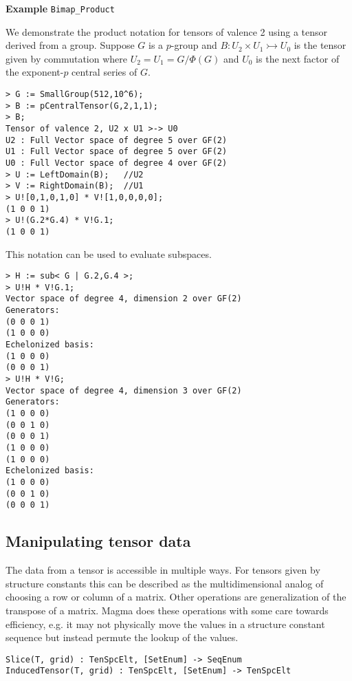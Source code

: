 \begin{framed} {\bf Example} {\tt Bimap\_Product}\\
{\small We demonstrate the product notation for tensors of valence 2 using a tensor derived from a group. 
Suppose $G$ is a $p$-group and $B : U_2\times U_1\rightarrowtail U_0$ is the tensor given by commutation where $U_2=U_1=G/\Phi(G)$ and $U_0$ is the next factor of the exponent-$p$ central series of $G$.
\begin{lstlisting}[frame=single,basicstyle=\ttfamily\color{black!30!
teal},backgroundcolor=\color{white!70!gray}]
> G := SmallGroup(512,10^6);
> B := pCentralTensor(G,2,1,1);
> B;
Tensor of valence 2, U2 x U1 >-> U0
U2 : Full Vector space of degree 5 over GF(2)
U1 : Full Vector space of degree 5 over GF(2)
U0 : Full Vector space of degree 4 over GF(2)
> U := LeftDomain(B);   //U2
> V := RightDomain(B);  //U1
> U![0,1,0,1,0] * V![1,0,0,0,0];
(1 0 0 1)
> U!(G.2*G.4) * V!G.1;
(1 0 0 1)
\end{lstlisting} 
This notation can be used to evaluate subspaces.
\begin{lstlisting}[frame=single,basicstyle=\ttfamily\color{black!30!
teal},backgroundcolor=\color{white!70!gray}]
> H := sub< G | G.2,G.4 >;
> U!H * V!G.1;
Vector space of degree 4, dimension 2 over GF(2)
Generators:
(0 0 0 1)
(1 0 0 0)
Echelonized basis:
(1 0 0 0)
(0 0 0 1)
> U!H * V!G;
Vector space of degree 4, dimension 3 over GF(2)
Generators:
(1 0 0 0)
(0 0 1 0)
(0 0 0 1)
(1 0 0 0)
(1 0 0 0)
Echelonized basis:
(1 0 0 0)
(0 0 1 0)
(0 0 0 1)
\end{lstlisting}
}
\end{framed}

\subsection{Manipulating tensor data}
The data from a tensor is accessible in multiple ways.   For 
tensors given by structure constants this can be described as the 
multidimensional analog of choosing a row or column of a matrix.
Other operations are generalization of the transpose of a matrix.
Magma does these operations with some care towards efficiency,
e.g. it may not physically move the values in a structure constant
sequence but instead permute the lookup of the values.


\color{blue}
{\small \begin{verbatim}
Slice(T, grid) : TenSpcElt, [SetEnum] -> SeqEnum
InducedTensor(T, grid) : TenSpcElt, [SetEnum] -> TenSpcElt
\end{verbatim} }
\color{black}

